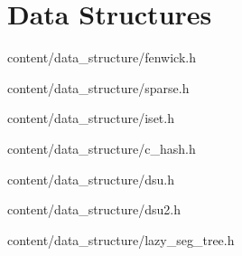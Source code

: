 \section{Data Structures}

{}
{content/data_structure/fenwick.h}

{}
{content/data_structure/sparse.h}

{}
{content/data_structure/iset.h}

{}
{content/data_structure/c_hash.h}

{}
{content/data_structure/dsu.h}

{}
{content/data_structure/dsu2.h}

{}
{content/data_structure/lazy_seg_tree.h}

